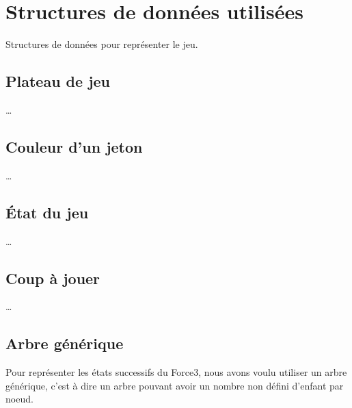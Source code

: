 \chapter{Structures de données utilisées} \label{chapter:structures-donnees}

Structures de données pour représenter le jeu.

\section{Plateau de jeu}

…

\section{Couleur d'un jeton}

…

\section{État du jeu}

…

\section{Coup à jouer}

…

\section{Arbre générique}

Pour représenter les états successifs du Force3, nous avons voulu utiliser un
arbre générique, c'est à dire un arbre pouvant avoir un nombre non défini
d'enfant par noeud.

